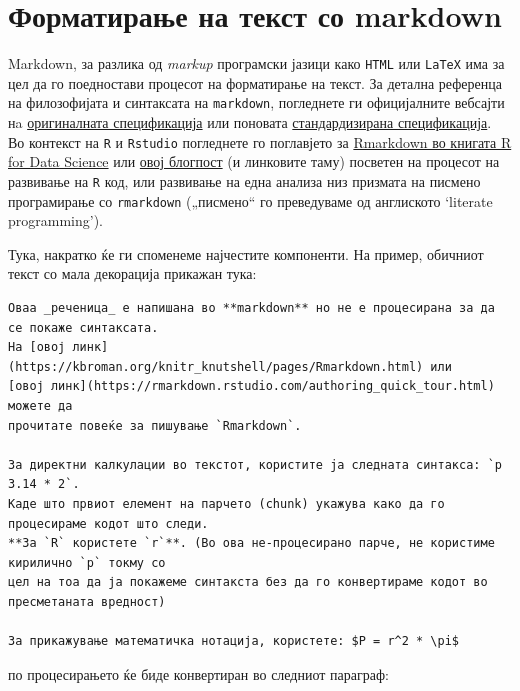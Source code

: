 \documentclass[
]{book}
\begin{document}
\hypertarget{ux444ux43eux440ux43cux430ux442ux438ux440ux430ux45aux435-ux43dux430-ux442ux435ux43aux441ux442-ux441ux43e-markdown}{%
\section{Форматирање на текст со markdown}\label{ux444ux43eux440ux43cux430ux442ux438ux440ux430ux45aux435-ux43dux430-ux442ux435ux43aux441ux442-ux441ux43e-markdown}}

Markdown, за разлика од \emph{markup} програмски јазици како \texttt{HTML} или \texttt{LaTeX} има за цел да го поедностави процесот на форматирање на текст. За детална референца на филозофијата и синтаксата на \texttt{markdown}, погледнете ги официјалните вебсајти нa \href{https://daringfireball.net/projects/markdown/syntax}{оригиналната спецификација} или поновата \href{https://commonmark.org/}{стандардизирана спецификација}. Во контекст на \texttt{R} и \texttt{Rstudio} погледнете го поглавјето за \href{https://r4ds.had.co.nz/r-markdown.html}{Rmarkdown во книгата R for Data Science} или \href{https://emilyriederer.netlify.app/post/rmarkdown-driven-development/}{овој блогпост} (и линковите таму) посветен на процесот на развивање на \texttt{R} код, или развивање на една анализа низ призмата на писмено програмирање со \texttt{rmarkdown} („писмено`` го преведуваме од англиското `literate programming').

Тука, накратко ќе ги споменеме најчестите компоненти. На пример, обичниот текст со мала декорација прикажан тука:

\begin{verbatim}
Оваа _реченица_ е напишана во **markdown** но не е процесирана за да се покаже синтаксата. 
На [овој линк](https://kbroman.org/knitr_knutshell/pages/Rmarkdown.html) или 
[овој линк](https://rmarkdown.rstudio.com/authoring_quick_tour.html) можете да 
прочитате повеќе за пишување `Rmarkdown`. 

За директни калкулации во текстот, користите ja следната синтакса: `р 3.14 * 2`. 
Kаде што првиот елемент на парчето (chunk) укажува како да го процесираме кодот што следи. 
**За `R` користете `r`**. (Во ова не-процесирано парче, не користиме кирилично `р` токму со
цел на тоа да ја покажеме синтакста без да го конвертираме кодот во пресметаната вредност)

За прикажување математичка нотација, користете: $P = r^2 * \pi$
\end{verbatim}

по процесирањето ќе биде конвертиран во следниот параграф:
\end{document}
